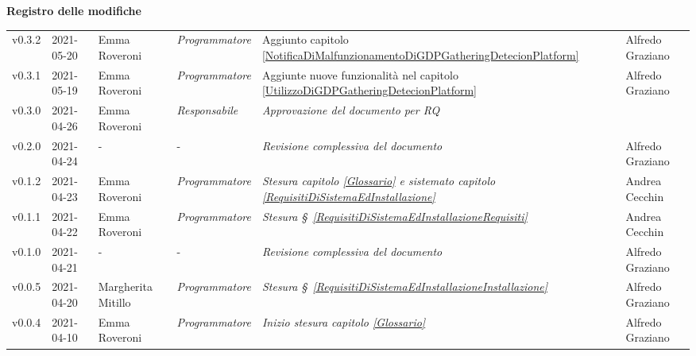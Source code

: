 \quad
\begin{center}
	\LARGE\textbf{Registro delle modifiche}
\end{center}
\def\tabularxcolumn#1{m{#1}}
{

	\begin{center}
		\renewcommand{\arraystretch}{1.4}
		\begin{longtable}[c]{|p{2cm-1\tabcolsep}|p{2cm}|p{3cm-2\tabcolsep}|p{3cm-1.5\tabcolsep}|p{}|p{}|}
			\hline
			\rowcolor{airforceblue}
			\makecell[c]{\textbf{Versione}} & \makecell[c]{\textbf{Data}} & \makecell[c]{\textbf{Autore}} & \makecell[c]{\textbf{Ruolo}} & \makecell[c]{\textbf{Modifica}} & \makecell[c]{\textbf{Verificatore}}\\
			\hline
			\centering v0.3.2 & 2021-05-20 & Emma Roveroni & \textit{Programmatore}  & Aggiunto capitolo \ref{NotificaDiMalfunzionamentoDiGDPGatheringDetecionPlatform} & Alfredo Graziano \\
			\hline
			\centering v0.3.1 & 2021-05-19 & Emma Roveroni & \textit{Programmatore}  & Aggiunte nuove funzionalità nel capitolo \ref{UtilizzoDiGDPGatheringDetecionPlatform} & Alfredo Graziano \\
			\hline
			\centering v0.3.0 & 2021-04-26 & Emma Roveroni & \textit{Responsabile}  & \textit{Approvazione del documento per RQ} & \makecell[c]{-} \\
			\hline
			\centering v0.2.0 & 2021-04-24 & \centering - & \centering-  & \textit{Revisione complessiva del documento} & Alfredo Graziano \\
			\hline
			\centering v0.1.2 & 2021-04-23 & Emma Roveroni & \textit{Programmatore} & \textit{Stesura capitolo \ref{Glossario} e sistemato capitolo \ref{RequisitiDiSistemaEdInstallazione} } & Andrea Cecchin \\
			\centering v0.1.1 & 2021-04-22 & Emma Roveroni & \textit{Programmatore} & \textit{Stesura \S~\ref{RequisitiDiSistemaEdInstallazioneRequisiti}} & Andrea Cecchin \\
			\hline
			\centering v0.1.0 & 2021-04-21 & \centering - & \centering-  & \textit{Revisione complessiva del documento} & Alfredo Graziano \\
			\hline
			\centering v0.0.5 & 2021-04-20 & Margherita Mitillo & \textit{Programmatore} & \textit{Stesura \S~\ref{RequisitiDiSistemaEdInstallazioneInstallazione}} & Alfredo Graziano \\
			\hline
			\centering v0.0.4 & 2021-04-10 & Emma Roveroni & \textit{Programmatore} & \textit{Inizio stesura capitolo \ref{Glossario}} & Alfredo Graziano \\

\end{longtable}
\end{center}}
